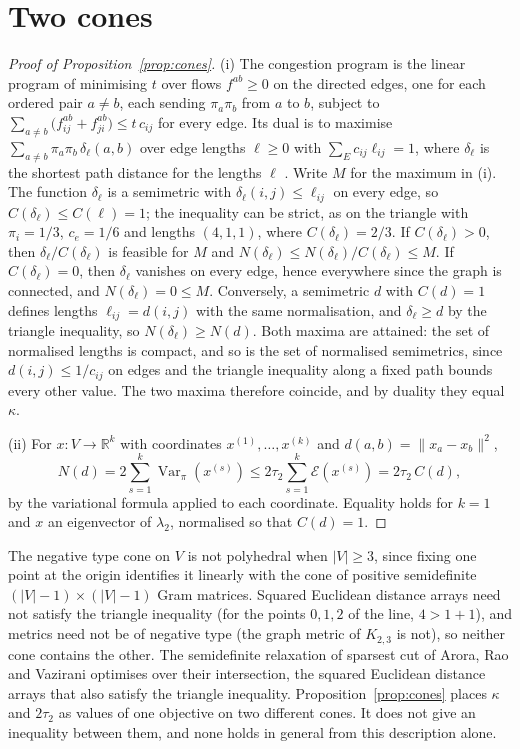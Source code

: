 \documentclass[11pt]{amsart}
\theoremstyle{remark}
\numberwithin{equation}{section}
\newcommand{\R}{\mathbb R}
\begin{document}
\section{Two cones}

\begin{proof}[Proof of Proposition~\ref{prop:cones}]
(i) The congestion program is the linear program of minimising $t$ over flows $f^{ab}\ge0$ on the directed edges, one for each ordered pair $a\ne b$, each sending $\pi_a\pi_b$ from $a$ to $b$, subject to $\sum_{a\ne b}\bigl(f^{ab}_{ij}+f^{ab}_{ji}\bigr)\le t\,c_{ij}$ for every edge. Its dual is to maximise $\sum_{a\ne b}\pi_a\pi_b\,\delta_\ell(a,b)$ over edge lengths $\ell\ge0$ with $\sum_E c_{ij}\ell_{ij}=1$, where $\delta_\ell$ is the shortest path distance for the lengths $\ell$ \cite{LR,LLR}. Write $M$ for the maximum in (i). The function $\delta_\ell$ is a semimetric with $\delta_\ell(i,j)\le\ell_{ij}$ on every edge, so $C(\delta_\ell)\le C(\ell)=1$; the inequality can be strict, as on the triangle with $\pi_i=1/3$, $c_e=1/6$ and lengths $(4,1,1)$, where $C(\delta_\ell)=2/3$. If $C(\delta_\ell)>0$, then $\delta_\ell/C(\delta_\ell)$ is feasible for $M$ and $N(\delta_\ell)\le N(\delta_\ell)/C(\delta_\ell)\le M$. If $C(\delta_\ell)=0$, then $\delta_\ell$ vanishes on every edge, hence everywhere since the graph is connected, and $N(\delta_\ell)=0\le M$. Conversely, a semimetric $d$ with $C(d)=1$ defines lengths $\ell_{ij}=d(i,j)$ with the same normalisation, and $\delta_\ell\ge d$ by the triangle inequality, so $N(\delta_\ell)\ge N(d)$. Both maxima are attained: the set of normalised lengths is compact, and so is the set of normalised semimetrics, since $d(i,j)\le1/c_{ij}$ on edges and the triangle inequality along a fixed path bounds every other value. The two maxima therefore coincide, and by duality they equal $\kappa$.

(ii) For $x\colon V\to\R^k$ with coordinates $x^{(1)},\dots,x^{(k)}$ and $d(a,b)=\|x_a-x_b\|^2$,
\[
N(d)=2\sum_{s=1}^k\operatorname{Var}_\pi(x^{(s)})\le 2\tau_2\sum_{s=1}^k\mathcal E(x^{(s)})=2\tau_2\,C(d),
\]
by the variational formula applied to each coordinate. Equality holds for $k=1$ and $x$ an eigenvector of $\lambda_2$, normalised so that $C(d)=1$.
\end{proof}

The negative type cone on $V$ is not polyhedral when $|V|\ge3$, since fixing one point at the origin identifies it linearly with the cone of positive semidefinite $(|V|-1)\times(|V|-1)$ Gram matrices. Squared Euclidean distance arrays need not satisfy the triangle inequality (for the points $0,1,2$ of the line, $4>1+1$), and metrics need not be of negative type (the graph metric of $K_{2,3}$ is not), so neither cone contains the other. The semidefinite relaxation of sparsest cut of Arora, Rao and Vazirani \cite{ARV} optimises over their intersection, the squared Euclidean distance arrays that also satisfy the triangle inequality. Proposition~\ref{prop:cones} places $\kappa$ and $2\tau_2$ as values of one objective on two different cones. It does not give an inequality between them, and none holds in general from this description alone.
\end{document}
